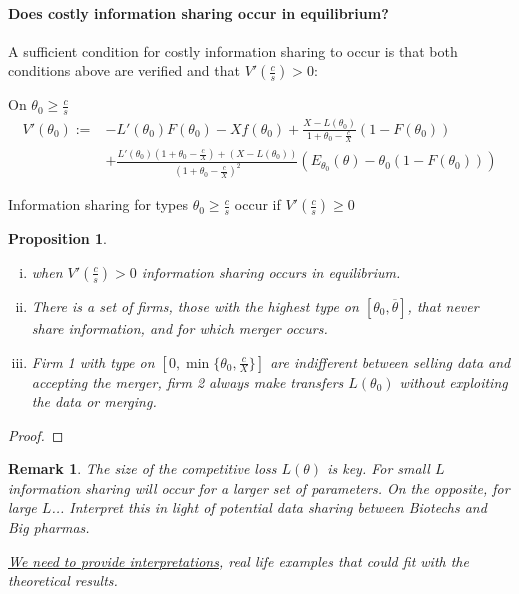 \documentclass[a4paper]{article}
\newtheorem{prop}{Proposition}
\newtheorem{remark}{Remark}
\renewcommand{\t}{\theta}
\begin{document}
\paragraph{Does costly information sharing occur in equilibrium?}

A sufficient condition for costly information sharing to occur is that both conditions above are verified and that $V'(\frac{c}{s})>0$:

\medskip

On $\t_0\geq\frac{c}{s}$
\begin{equation}
\begin{aligned}
  V'(\t_0):=&-L'(\t_0)F(\t_0)-X f(\t_0)+\frac{X-L(\t_0)}{1+\t_0-\frac{c}{X}}(1-F(\t_0))\\
  &+\frac{L'(\t_0)(1+\t_0-\frac{c}{X})+(X-L(\t_0))}{(1+\t_0-\frac{c}{X})^2}(E_{\t_0}(\t)-\t_0(1-F(\t_0)))
\end{aligned}
\end{equation}



Information sharing for types $\t_0\geq \frac{c}{s}$ occur if $V'(\frac{c}{s})\geq 0$

\begin{prop}~~
  \begin{enumerate}[(i)]\setlength\itemsep{0em}
    \item when $V'(\frac{c}{s})>0$ information sharing occurs in equilibrium.
    \item There is a set of firms, those with the highest type on $[\t_0,\overline \t]$, that never share information, and for which merger occurs.
    \item Firm 1 with type on $[0,\min\{\t_0,\frac{c}{X}\}]$ are indifferent between selling data and accepting the merger, firm 2 always make transfers $L(\t_0)$ without exploiting the data or merging.
  \end{enumerate}
\end{prop}

\begin{proof}

\end{proof}

\begin{remark}
  The size of the competitive loss $L(\t)$ is key. For small $L$ information sharing will occur for a larger set of parameters. On the opposite, for large $L$... Interpret this in light of potential data sharing between Biotechs and Big pharmas.

  \underline{We need to provide interpretations}, real life examples that could fit with the theoretical results. 
  \end{remark}
  
\end{document}
